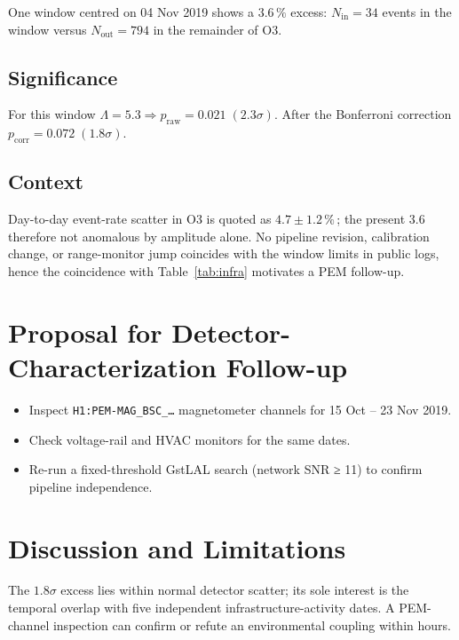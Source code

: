\documentclass[
  reprint,
  nofootinbib,
  amsmath,amssymb,
  aps,prd,
  superscriptaddress
]{revtex4-2}
\begin{document}
One window centred on 04 Nov 2019 shows a \(3.6\,\%\) excess:
\(N_{\text{in}} = 34\) events in the window versus
\(N_{\text{out}} = 794\) in the remainder of O3.

\subsection{Significance}
For this window
\(\Lambda = 5.3 \Rightarrow p_\text{raw} = 0.021\;(2.3\sigma)\).
After the Bonferroni correction \(p_\text{corr} = 0.072\;(1.8\sigma)\).

\subsection{Context}
Day-to-day event-rate scatter in O3 is quoted as
\(4.7 \pm 1.2\,\%\)\,\cite{davis2021}; the present 3.6 %
therefore not anomalous by amplitude alone.  No pipeline revision,
calibration change, or range-monitor jump coincides with the window
limits in public logs, hence the coincidence with
Table~\ref{tab:infra} motivates a PEM follow-up.

\section{Proposal for Detector-Characterization Follow-up}

\begin{itemize}
  \item Inspect \texttt{H1:PEM-MAG\_BSC\_…} magnetometer channels for
        15 Oct – 23 Nov 2019.  
  \item Check voltage-rail and HVAC monitors for the same dates.  
  \item Re-run a fixed-threshold GstLAL search (network SNR ≥ 11) to
        confirm pipeline independence.
\end{itemize}

\section{Discussion and Limitations}
The \(1.8\sigma\) excess lies within normal detector scatter; its sole
interest is the temporal overlap with five independent
infrastructure-activity dates.  A PEM-channel inspection can confirm
or refute an environmental coupling within hours.

\end{document}
